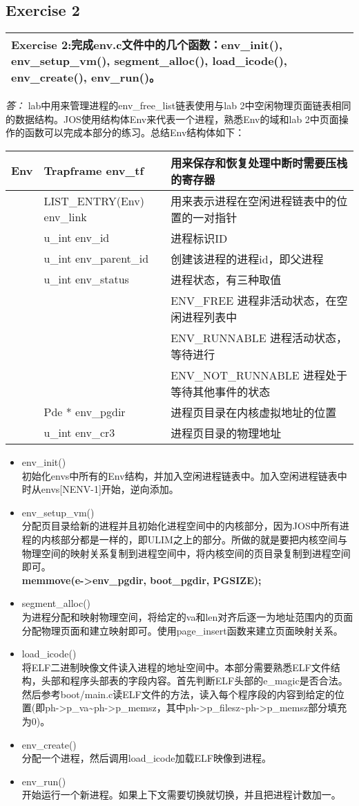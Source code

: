 \documentclass[11pt,a4paper]{article}
\newcommand{\exercise}[2]{
\begin{tabular}{|p{\textwidth}|}
\hline
Exercise #1:#2\\
\hline
\end{tabular}
\textit{\large{答：}}}
\begin{document}
\subsection{Exercise 2}
\exercise{2}{完成env.c文件中的几个函数：env\_init(), env\_setup\_vm(), segment\_alloc(), load\_icode(), env\_create(), env\_run()。}
lab中用来管理进程的env\_free\_list链表使用与lab 2中空闲物理页面链表相同的数据结构。JOS使用结构体Env来代表一个进程，熟悉Env的域和lab 2中页面操作的函数可以完成本部分的练习。总结Env结构体如下：\\
\begin{tabular}{r|l p{}}
\hline
Env & Trapframe env\_tf & 用来保存和恢复处理中断时需要压栈的寄存器\\
\hline
& LIST\_ENTRY(Env) env\_link & 用来表示进程在空闲进程链表中的位置的一对指针\\
\hline
& u\_int env\_id & 进程标识ID\\
\hline
& u\_int env\_parent\_id & 创建该进程的进程id，即父进程\\
\hline
& u\_int env\_status & 进程状态，有三种取值\\
& & ENV\_FREE 进程非活动状态，在空闲进程列表中\\
& & ENV\_RUNNABLE 进程活动状态，等待进行\\
& & ENV\_NOT\_RUNNABLE 进程处于等待其他事件的状态\\
\hline
& Pde * env\_pgdir & 进程页目录在内核虚拟地址的位置\\
\hline
& u\_int env\_cr3 & 进程页目录的物理地址\\
\hline
\end{tabular}
\begin{itemize}
\item env\_init()\\
初始化envs中所有的Env结构，并加入空闲进程链表中。加入空闲进程链表中时从envs[NENV-1]开始，逆向添加。
\item env\_setup\_vm()\\
分配页目录给新的进程并且初始化进程空间中的内核部分，因为JOS中所有进程的内核部分都是一样的，即ULIM之上的部分。所做的就是要把内核空间与物理空间的映射关系复制到进程空间中，将内核空间的页目录复制到进程空间即可。\\
\indent \textbf{memmove(e->env\_pgdir, boot\_pgdir, PGSIZE);}
\item segment\_alloc()\\
为进程分配和映射物理空间，将给定的va和len对齐后逐一为地址范围内的页面分配物理页面和建立映射即可。使用page\_insert函数来建立页面映射关系。
\item load\_icode()\\
将ELF二进制映像文件读入进程的地址空间中。本部分需要熟悉ELF文件结构，头部和程序头部表的字段内容。首先判断ELF头部的e\_magic是否合法。然后参考boot/main.c读ELF文件的方法，读入每个程序段的内容到给定的位置(即ph->p\_va\~{}ph->p\_memsz，其中ph->p\_filesz\~{}ph->p\_memsz部分填充为0)。
\item env\_create()\\
分配一个进程，然后调用load\_icode加载ELF映像到进程。
\item env\_run()\\
开始运行一个新进程。如果上下文需要切换就切换，并且把进程计数加一。
\end{itemize}
\end{document}
